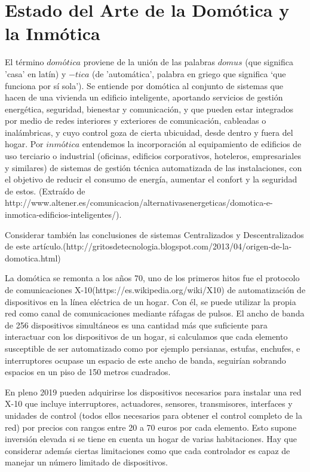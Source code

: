 \section{Estado del Arte de la Domótica y la Inmótica}
\label{makereference1.1.1}

El término $domótica$ proviene de la unión de las palabras $domus$ (que significa 'casa' en latín) y $-tica$ (de 'automática', palabra en griego que significa ‘que funciona por sí sola’). Se entiende por domótica al conjunto de sistemas que hacen de una vivienda un edificio inteligente, aportando servicios de gestión energética, seguridad, bienestar y comunicación, y que pueden estar integrados por medio de redes interiores y exteriores de comunicación, cableadas o inalámbricas, y cuyo control goza de cierta ubicuidad, desde dentro y fuera del hogar.
Por $inmótica$ entendemos la incorporación al equipamiento de edificios de uso terciario o industrial (oficinas, edificios corporativos, hoteleros, empresariales y similares) de sistemas de gestión técnica automatizada de las instalaciones, con el objetivo de reducir el consumo de energía, aumentar el confort y la seguridad de estos.
(Extraído de http://www.altener.es/comunicacion/alternativasenergeticas/domotica-e-inmotica-edificios-inteligentes/).

Considerar también las conclusiones de sistemas Centralizados y Descentralizados de este artículo.(http://gritosdetecnologia.blogspot.com/2013/04/origen-de-la-domotica.html)

La domótica se remonta a los años 70, uno de los primeros hitos fue el protocolo de comunicaciones X-10(https://es.wikipedia.org/wiki/X10) de automatización de dispositivos en la línea eléctrica de un hogar. Con él, se puede utilizar la propia red como canal de comunicaciones mediante ráfagas de pulsos. El ancho de banda de 256 dispositivos simultáneos es una cantidad más que suficiente para interactuar con los dispositivos de un hogar, si calculamos que cada elemento susceptible de ser automatizado como por ejemplo persianas, estufas, enchufes, e interruptores ocupase un espacio de este ancho de banda, seguirían sobrando espacios en un piso de 150 metros cuadrados.

En pleno 2019 pueden adquirirse los dispositivos necesarios para instalar una red X-10 que incluye interruptores, actuadores, sensores, transmisores, interfaces y unidades de control (todos ellos necesarios para obtener el control completo de la red) por precios con rangos entre 20 a 70 euros por cada elemento. Esto supone inversión elevada si se tiene en cuenta un hogar de varias habitaciones. Hay que considerar además ciertas limitaciones como que cada controlador es capaz de manejar un número limitado de dispositivos.

